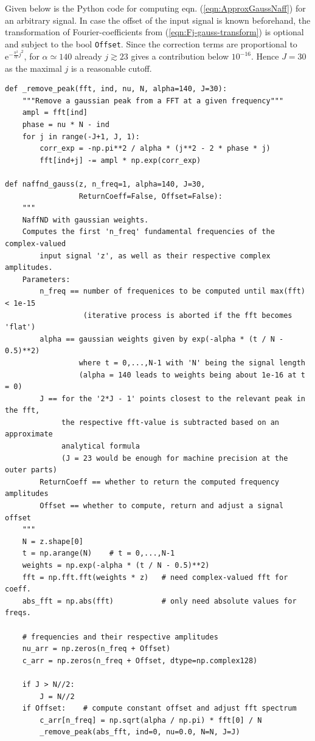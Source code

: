 \documentclass[english, parskip=full]{scrartcl}
\newcommand{\e}{\text{e}}
\begin{document}
\newpage
Given below is the Python code for computing eqn. (\ref{eqn:ApproxGaussNaff}) for an arbitrary signal.
In case the offset of the input signal is known beforehand, the transformation of Fourier-coefficients from (\ref{eqn:Fj-gauss-transform}) is optional and subject to the bool \texttt{Offset}.
Since the correction terms are proportional to $\e^{-\frac{\pi^2}{\alpha}j^2}$, for $\alpha\simeq 140$ already $j\gtrsim 23$ gives a contribution below $10^{-16}$.
Hence $J=30$ as the maximal $j$ is a reasonable cutoff.
\begin{verbatim}
def _remove_peak(fft, ind, nu, N, alpha=140, J=30):
    """Remove a gaussian peak from a FFT at a given frequency"""
    ampl = fft[ind]
    phase = nu * N - ind
    for j in range(-J+1, J, 1):
        corr_exp = -np.pi**2 / alpha * (j**2 - 2 * phase * j)
        fft[ind+j] -= ampl * np.exp(corr_exp)
        
def naffnd_gauss(z, n_freq=1, alpha=140, J=30, 
                 ReturnCoeff=False, Offset=False):
    """
    NaffND with gaussian weights.
    Computes the first 'n_freq' fundamental frequencies of the complex-valued
        input signal 'z', as well as their respective complex amplitudes.
    Parameters:
        n_freq == number of frequenices to be computed until max(fft) < 1e-15
                  (iterative process is aborted if the fft becomes 'flat')
        alpha == gaussian weights given by exp(-alpha * (t / N - 0.5)**2)
                 where t = 0,...,N-1 with 'N' being the signal length
                 (alpha = 140 leads to weights being about 1e-16 at t = 0)
        J == for the '2*J - 1' points closest to the relevant peak in the fft,
             the respective fft-value is subtracted based on an approximate
             analytical formula
             (J = 23 would be enough for machine precision at the outer parts)
        ReturnCoeff == whether to return the computed frequency amplitudes
        Offset == whether to compute, return and adjust a signal offset
    """
    N = z.shape[0]
    t = np.arange(N)    # t = 0,...,N-1
    weights = np.exp(-alpha * (t / N - 0.5)**2)
    fft = np.fft.fft(weights * z)   # need complex-valued fft for coeff.
    abs_fft = np.abs(fft)           # only need absolute values for freqs.
    
    # frequencies and their respective amplitudes
    nu_arr = np.zeros(n_freq + Offset)
    c_arr = np.zeros(n_freq + Offset, dtype=np.complex128)     
    
    if J > N//2:
        J = N//2
    if Offset:    # compute constant offset and adjust fft spectrum
        c_arr[n_freq] = np.sqrt(alpha / np.pi) * fft[0] / N    
        _remove_peak(abs_fft, ind=0, nu=0.0, N=N, J=J)
    

\end{verbatim}
\end{document}
